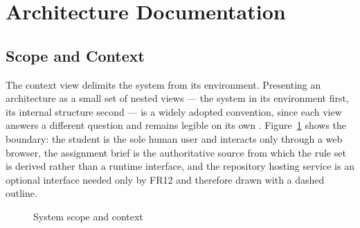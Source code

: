 \documentclass[a4paper,11pt]{article}
\begin{document}
\section{Architecture Documentation}\label{sec:architecture}

\subsection{Scope and Context}\label{subsec:context}

The context view delimits the system from its environment. Presenting an
architecture as a small set of nested views --- the system in its environment
first, its internal structure second --- is a widely adopted convention, since
each view answers a different question and remains legible on its own
\citep{Brown2024}. Figure~\ref{fig:context} shows the boundary: the student is
the sole human user and interacts only through a web browser, the assignment
brief is the authoritative source from which the rule set is derived rather than
a runtime interface, and the repository hosting service is an optional interface
needed only by FR12 and therefore drawn with a dashed outline.

\begin{figure}[H]
\centering
{}
\caption{System scope and context}
\label{fig:context}
\end{figure}
\end{document}
